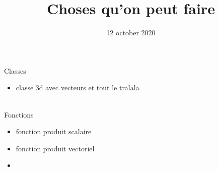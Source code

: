 \documentclass[a4paper,1pt]{article}
\title{Choses qu'on peut faire}
\date{12 october 2020}
\begin{document}
\maketitle

Classes
\begin{itemize}
    \item classe 3d avec vecteurs et tout le tralala
\end{itemize}
~\\

Fonctions
\begin{itemize}
    \item fonction produit scalaire
    \item fonction produit vectoriel
    \item 
\end{itemize}
\end{document}
